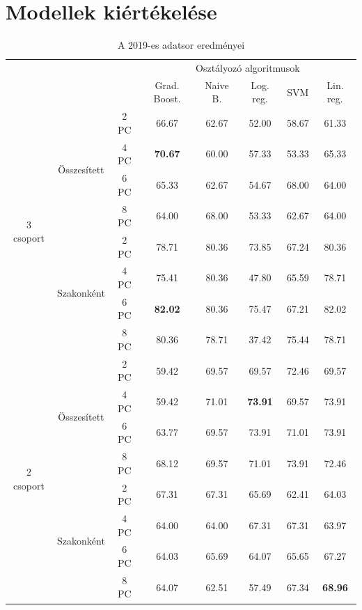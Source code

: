 \documentclass[12pt]{article}
\begin{document}
\newpage

\section{Modellek kiértékelése}

\begin{table}[H]
\centering
\begin{tabular}{ccc|ccccc}

    &&&\multicolumn{5}{c}{Osztályozó algoritmusok} \\
    &&& Grad. Boost. &  Naive B. & Log. reg.  &  SVM & Lin. reg. \\ 
        \hline
    \multirow{8}{*}{3 csoport}& \multirow{4}{*}{Összesített}&2 PC&66.67&62.67&52.00&58.67&61.33 \\
    												&&4 PC&\textbf{70.67}&60.00&57.33&53.33&65.33\\
    												&&6 PC&65.33&62.67&54.67&68.00&64.00\\
    												&&8 PC&64.00&68.00&53.33&62.67&64.00\\\cline{3-8}%
    						& \multirow{4}{*}{Szakonként}&2 PC&78.71&80.36&73.85&67.24&80.36 \\
    												&&4 PC&75.41&80.36&47.80&65.59&78.71\\
    												&&6 PC&\textbf{82.02}&80.36&75.47&67.21&82.02\\
    												&&8 PC&80.36&78.71&37.42&75.44&78.71\\
    						 
    \hline
    \hline
    \multirow{8}{*}{2 csoport}& \multirow{4}{*}{Összesített}&2 PC&59.42&69.57&69.57&72.46&69.57\\
    												&&4 PC&59.42&71.01&\textbf{73.91}&69.57&73.91\\
    												&&6 PC&63.77&69.57&73.91&71.01&73.91\\
    												&&8 PC&68.12&69.57&71.01&73.91&72.46\\\cline{3-8}
    						 & \multirow{4}{*}{Szakonként}&2 PC&67.31&67.31&65.69&62.41&64.03\\
    												&&4 PC&64.00&64.00&67.31&67.31&63.97\\
    												&&6 PC&64.03&65.69&64.07&65.65&67.27\\
    												&&8 PC&64.07&62.51&57.49&67.34&\textbf{68.96}\\
    												\hline
\end{tabular}
\caption{A 2019-es adatsor eredményei}
\label{tab:multicol1}
\end{table}
\end{document}
